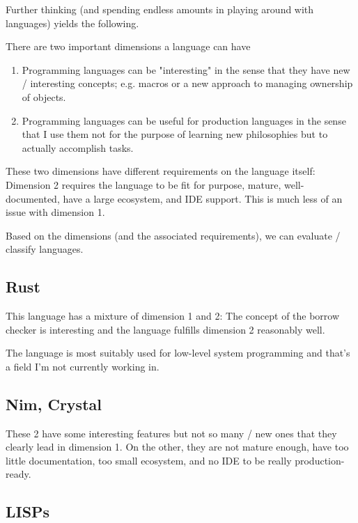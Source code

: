 
Further thinking (and spending endless amounts in playing around with languages) yields the following.

There are two important dimensions a language can have

\begin{enumerate}
	\item  Programming languages can be "interesting" in the sense that they have new / interesting concepts; e.g. macros or a new approach to managing ownership of objects.

	\item Programming languages can be useful for production languages in the sense that I use them not for the purpose of learning new philosophies but to actually accomplish tasks.
\end{enumerate}

These two dimensions have different requirements on the language itself: Dimension 2 requires the language to be fit for purpose, mature, well-documented, have a large ecosystem, and IDE support. This is much less of an issue with dimension 1.

Based on the dimensions (and the associated requirements), we can evaluate / classify languages.

\subsection{Rust}

This language has a mixture of dimension 1 and 2: The concept of the borrow checker is interesting and the language fulfills dimension 2 reasonably well.

The language is most suitably used for low-level system programming and that's a field I'm not currently working in.

\subsection{Nim, Crystal}

These 2 have some interesting features but not so many / new ones that they clearly lead in dimension 1. On the other, they are not mature enough, have too little documentation, too small ecosystem, and no IDE to be really production-ready.

\subsection{LISPs}

